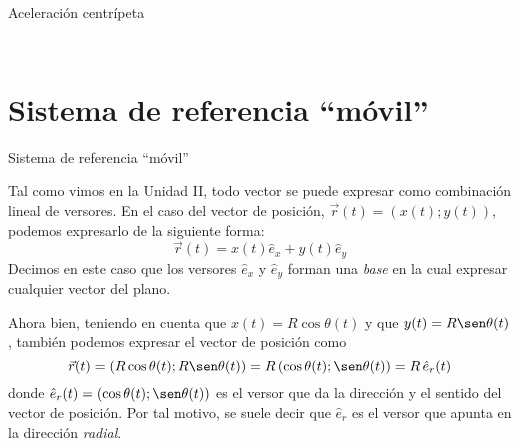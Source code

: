 \documentclass[11pt,handout,aspectratio=1610]{beamer}
\newcommand{\vs}{\vspace{11pt}}
\begin{document}
\begin{frame}{Aceleración centrípeta}
\begin{columns}
\begin{column}{0.4\textwidth}
\begin{figure}[h]
        \end{figure}
    \end{column}
\end{columns}

\end{frame}

\section{Sistema de referencia ``móvil''}

\begin{frame}{Sistema de referencia ``móvil''}
    
    Tal como vimos en la Unidad II, todo vector se puede expresar como combinación lineal de versores. En el caso del vector de posición, $\vec{r} (t) = \left(x(t); y(t)\right)$, podemos expresarlo de la siguiente forma: $$\vec{r}(t) = x(t) \hat{e}_x + y(t) \hat{e}_y $$ Decimos en este caso que los versores $\hat{e}_x$ y $\hat{e}_y$ forman una \emph{base} en la cual expresar cualquier vector del plano.

    \vs

    Ahora bien, teniendo en cuenta que $x(t) = R \cos \theta(t)$ y que $y(t) = R \sen \theta(t)$, también podemos expresar el vector de posición como $$ \vec{r}(t) = \left(R \cos \theta(t);  R \sen \theta(t)\right) = R \left(\cos \theta(t); \sen \theta(t)\right) = R \, \hat{e}_r (t)$$ donde $\hat{e}_r (t) = \left(\cos \theta(t); \sen \theta(t)\right)$ es el versor que da la dirección y el sentido del vector de posición. Por tal motivo, se suele decir que $\hat{e}_r$ es el versor que apunta en la dirección \emph{radial}.

\end{frame}
\end{document}
